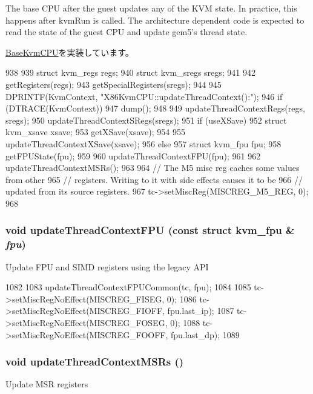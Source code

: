 The base CPU after the guest updates any of the KVM state. In practice, this happens after kvmRun is called. The architecture dependent code is expected to read the state of the guest CPU and update gem5's thread state. 

\hyperlink{classBaseKvmCPU_ac47bfb587580ca76050e0c9bc753c10d}{BaseKvmCPU}を実装しています。


\begin{DoxyCode}
938 {
939     struct kvm_regs regs;
940     struct kvm_sregs sregs;
941 
942     getRegisters(regs);
943     getSpecialRegisters(sregs);
944 
945     DPRINTF(KvmContext, "X86KvmCPU::updateThreadContext():\n");
946     if (DTRACE(KvmContext))
947         dump();
948 
949     updateThreadContextRegs(regs, sregs);
950     updateThreadContextSRegs(sregs);
951     if (useXSave) {
952         struct kvm_xsave xsave;
953         getXSave(xsave);
954 
955        updateThreadContextXSave(xsave);
956     } else {
957         struct kvm_fpu fpu;
958         getFPUState(fpu);
959 
960         updateThreadContextFPU(fpu);
961     }
962     updateThreadContextMSRs();
963 
964     // The M5 misc reg caches some values from other
965     // registers. Writing to it with side effects causes it to be
966     // updated from its source registers.
967     tc->setMiscReg(MISCREG_M5_REG, 0);
968 }
\end{DoxyCode}
\hypertarget{classX86KvmCPU_a1f9b85cc469eb72bbf377872c1404c1e}{
\subsubsection[{updateThreadContextFPU}]{\setlength{\rightskip}{0pt plus 5cm}void updateThreadContextFPU (const struct kvm\_\-fpu \& {\em fpu})}}
\label{classX86KvmCPU_a1f9b85cc469eb72bbf377872c1404c1e}
Update FPU and SIMD registers using the legacy API 


\begin{DoxyCode}
1082 {
1083     updateThreadContextFPUCommon(tc, fpu);
1084 
1085     tc->setMiscRegNoEffect(MISCREG_FISEG, 0);
1086     tc->setMiscRegNoEffect(MISCREG_FIOFF, fpu.last_ip);
1087     tc->setMiscRegNoEffect(MISCREG_FOSEG, 0);
1088     tc->setMiscRegNoEffect(MISCREG_FOOFF, fpu.last_dp);
1089 }
\end{DoxyCode}
\hypertarget{classX86KvmCPU_ad0f81dc69ee0b095b4c9eeec4491ed39}{
\subsubsection[{updateThreadContextMSRs}]{\setlength{\rightskip}{0pt plus 5cm}void updateThreadContextMSRs ()}}
\label{classX86KvmCPU_ad0f81dc69ee0b095b4c9eeec4491ed39}
Update MSR registers 


